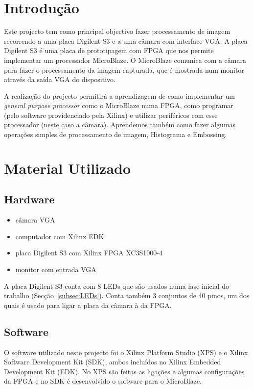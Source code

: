 \documentclass[a4paper]{article}
\begin{document}


\tableofcontents
\pagebreak

\section{Introdução}
Este projecto tem como principal objectivo fazer processamento de imagem recorrendo a uma placa Digilent S3 e a uma câmara com interface VGA. A placa Digilent S3 é uma placa de prototipagem com FPGA que nos permite implementar um processador MicroBlaze. O MicroBlaze comunica com a câmara para fazer o processamento da imagem capturada, que é mostrada num monitor através da saída VGA do dispositivo.

A realização do projecto permitirá a aprendizagem de como implementar um \textit{general purpose processor} como o MicroBlaze numa FPGA, como programar (pelo software providenciado pela Xilinx\textregistered) e utilizar periféricos com esse processador (neste caso a câmara). Aprendemos também como fazer algumas operações simples de processamento de imagem, Histograma e Embossing.


\section{Material Utilizado}
\subsection*{Hardware}
\begin{itemize}
\item câmara VGA
\item computador com Xilinx EDK
\item placa Digilent S3 com Xilinx FPGA XC3S1000-4
\item monitor com entrada VGA
\end{itemize}

A placa Digilent S3 conta com 8 LEDs que são usados numa fase inicial do trabalho (Secção~\ref{subsec:LEDs}). Conta também 3 conjuntos de 40 pinos, um dos quais é usado para ligar a placa da câmara à da FPGA.

\subsection*{Software}
O software utilizado neste projecto foi o Xilinx Platform Studio (XPS) e o Xilinx Software Development Kit (SDK), ambos incluídos no Xilinx Embedded Development Kit (EDK). No XPS são feitas as ligações e algumas configurações da FPGA e no SDK é desenvolvido o software para o MicroBlaze.
\end{document}
